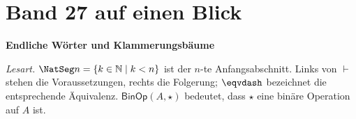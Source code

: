 \chapter[Band 27: Endliche Wörter und Klammerungsbäume]{Band 27 auf einen Blick}
\noindent\textbf{Endliche Wörter und Klammerungsbäume}\par\medskip

\begingroup
\setlength{\aboverulesep}{6pt}
\newcommand{\BinaryAddresses}{\mathcal W_2}
\newcommand{\AddressPrefixMap}[1]{\operatorname{vor}_{#1}}
\newcommand{\AddressPrefix}[2]{\AddressPrefixMap{#1}(#2)}
\newcommand{\AddressGraft}[2]{\Gamma(#1,#2)}
\newcommand{\GoodAddressSet}[1]{\mathsf{VollPraef}(#1)}
\newcommand{\TreePositions}[2]{\operatorname{Pos}_{#1}(#2)}
\newcommand{\AddressEdges}[1]{E_{#1}^{\mathrm{adr}}}
\newcommand{\AddressInner}[1]{I_{#1}^{\mathrm{adr}}}
\newcommand{\AddressLeft}[1]{\lambda_{#1}^{\mathrm{adr}}}
\newcommand{\AddressRight}[1]{\rho_{#1}^{\mathrm{adr}}}
\newcommand{\TreePositionGraph}[2]{\mathcal G_{#1}^{\mathrm{adr}}(#2)}
\begingroup
\small
\setlength{\LTleft}{0pt}
\setlength{\LTright}{0pt}
\setlength{\LTpre}{.5\baselineskip}
\setlength{\LTpost}{0pt}
\renewcommand{\arraystretch}{1.08}
\newcommand{\BXXVIIBlickFormel}[1]{%
  \par\smallskip\noindent\(\displaystyle #1\)\par}
\newcommand{\BXXVIIBlickQuellen}[1]{%
  \par\nobreak\smallskip{\footnotesize #1}\par}

\noindent
\emph{Lesart.}
\(\NatSeg n=\{k\in\mathbb N\mid k<n\}\) ist der \(n\)-te Anfangsabschnitt.
Links von \(\vdash\) stehen die Voraussetzungen, rechts die Folgerung;
\(\eqvdash\) bezeichnet die entsprechende Äquivalenz.
\(\mathsf{BinOp}(A,\star)\) bedeutet, dass \(\star\) eine binäre Operation
auf \(A\) ist.

